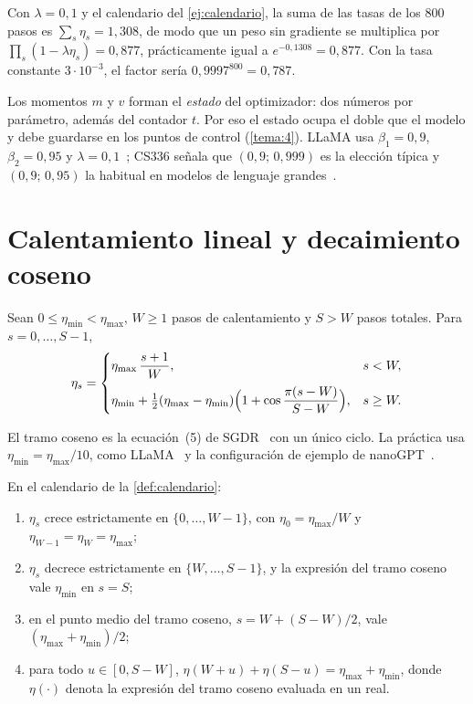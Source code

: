 \begin{ejemplo}\label{ej:encoge}
Con $\lambda=0{,}1$ y el calendario del \cref{ej:calendario}, la suma de las tasas de los 800 pasos es $\sum_s\eta_s=1{,}308$, de modo que un peso sin gradiente se multiplica por $\prod_s(1-\lambda\eta_s)=0{,}877$, prácticamente igual a $e^{-0{,}1308}=0{,}877$. Con la tasa constante $3\cdot 10^{-3}$, el factor sería $0{,}9997^{800}=0{,}787$.
\end{ejemplo}

Los momentos $m$ y $v$ forman el \emph{estado} del optimizador: dos números por parámetro, además del contador $t$. Por eso el estado ocupa el doble que el modelo y debe guardarse en los puntos de control (\cref{tema:4}). LLaMA usa $\beta_1=0{,}9$, $\beta_2=0{,}95$ y $\lambda=0{,}1$~\cite[§2.3]{llama}; CS336 señala que $(0{,}9;\allowbreak\,0{,}999)$ es la elección típica y $(0{,}9;\allowbreak\,0{,}95)$ la habitual en modelos de lenguaje grandes~\cite[§4.3]{cs336}.

\section{Calentamiento lineal y decaimiento coseno}

\begin{definicion}\label{def:calendario}
Sean $0\le\eta_{\min}<\eta_{\max}$, $W\ge 1$ pasos de calentamiento y $S>W$ pasos totales. Para $s=0,\dots,S-1$,
\[
\eta_s=\begin{cases}
\eta_{\max}\,\dfrac{s+1}{W}, & s<W,\\[3mm]
\eta_{\min}+\tfrac12(\eta_{\max}-\eta_{\min})\Bigl(1+\cos\dfrac{\pi(s-W)}{S-W}\Bigr), & s\ge W.
\end{cases}
\]
\end{definicion}

El tramo coseno es la ecuación~(5) de SGDR~\cite[§3]{sgdr} con un único ciclo. La práctica usa $\eta_{\min}=\eta_{\max}/10$, como LLaMA~\cite[§2.3]{llama} y la configuración de ejemplo de nanoGPT~\cite{nanogpt}.

\begin{proposicion}\label{prop:calendario}
En el calendario de la \cref{def:calendario}:
\begin{enumerate}
  \item $\eta_s$ crece estrictamente en $\{0,\dots,W-1\}$, con $\eta_0=\eta_{\max}/W$ y $\eta_{W-1}=\eta_W=\eta_{\max}$;
  \item $\eta_s$ decrece estrictamente en $\{W,\dots,S-1\}$, y la expresión del tramo coseno vale $\eta_{\min}$ en $s=S$;
  \item en el punto medio del tramo coseno, $s=W+(S-W)/2$, vale $(\eta_{\max}+\eta_{\min})/2$;
  \item para todo $u\in[0,S-W]$, $\eta(W+u)+\eta(S-u)=\eta_{\max}+\eta_{\min}$, donde $\eta(\cdot)$ denota la expresión del tramo coseno evaluada en un real.
\end{enumerate}
\end{proposicion}

